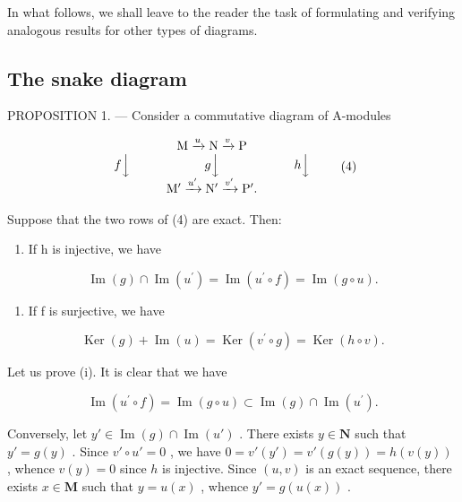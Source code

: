 In what follows, we shall leave to the reader the task of formulating and verifying analogous results for other types of diagrams.

\subsection{The snake diagram}

PROPOSITION 1. --- Consider a commutative diagram of A-modules

\[
\begin{array}{c} \mathrm{M} \xrightarrow {u} \mathrm{N} \xrightarrow {v} \mathrm{P} \\ f \Big \downarrow \qquad \qquad \qquad g \Big \downarrow \qquad \qquad \qquad h \Big \downarrow \\ \mathrm{M} ^ {\prime} \xrightarrow {u ^ {\prime}} \mathrm{N} ^ {\prime} \xrightarrow {v ^ {\prime}} \mathrm{P} ^ {\prime}. \end{array}\tag{4}
\]

Suppose that the two rows of (4) are exact. Then:

\begin{enumerate}
\def\labelenumi{(\roman{enumi})}
\tightlist
\item
  If h is injective, we have
\end{enumerate}

\[
\operatorname{Im} (g) \cap \operatorname{Im} \left(u ^ {\prime}\right) = \operatorname{Im} \left(u ^ {\prime} \circ f\right) = \operatorname{Im} (g \circ u).\tag{5}
\]

\begin{enumerate}
\def\labelenumi{(\roman{enumi})}
\setcounter{enumi}{1}
\tightlist
\item
  If f is surjective, we have
\end{enumerate}

\[
\operatorname{Ker} (g) + \operatorname{Im} (u) = \operatorname{Ker} \left(v ^ {\prime} \circ g\right) = \operatorname{Ker} (h \circ v).\tag{6}
\]

Let us prove (i). It is clear that we have

\[
\operatorname{Im} \left(u ^ {\prime} \circ f\right) = \operatorname{Im} (g \circ u) \subset \operatorname{Im} (g) \cap \operatorname{Im} \left(u ^ {\prime}\right).
\]

Conversely, let \(y' \in \operatorname{Im}(g) \cap \operatorname{Im}(u')\) . There exists \(y \in \mathbf{N}\) such that \(y' = g(y)\) . Since \(v' \circ u' = 0\) , we have \(0 = v'(y') = v'(g(y)) = h(v(y))\) , whence \(v(y) = 0\) since \(h\) is injective. Since \((u, v)\) is an exact sequence, there exists \(x \in \mathbf{M}\) such that \(y = u(x)\) , whence \(y' = g(u(x))\) .

